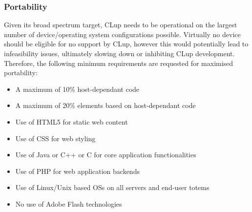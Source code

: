 \subsubsection{Portability}
Given its broad spectrum target, CLup needs to be operational on the largest number of device/operating system configurations possible. Virtually no device should be eligible for no support by CLup, however this would potentially lead to infeasibility issues, ultimately slowing down or inhibiting CLup development. \newline
Therefore, the following minimum requirements are requested for maximised portability:\newline
\begin{itemize}
    \item A maximum of 10\% host-dependant code
    \item A maximum of 20\% elements based on host-dependant code
    \item Use of HTML5 for static web content
    \item Use of CSS for web styling
    \item Use of Java or C++ or C for core application functionalities
    \item Use of PHP for web application backends
    \item Use of Linux/Unix based OSs on all servers and end-user totems
    \item No use of Adobe \textregistered \space Flash \textregistered \space technologies
\end{itemize}

